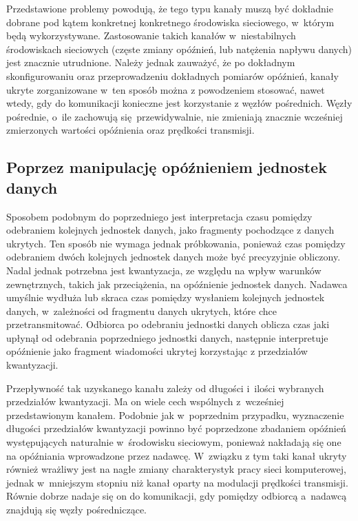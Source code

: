 \documentclass[a4paper, twoside, openright, 12pt]{report}
\begin{document}
        Przedstawione problemy powodują, że tego typu kanały muszą być dokładnie
        dobrane pod kątem konkretnej konkretnego środowiska sieciowego, w~którym będą wykorzystywane.
        Zastosowanie takich kanałów w~niestabilnych środowiskach sieciowych (częste zmiany
        opóźnień, lub natężenia napływu danych) jest znacznie utrudnione. Należy jednak
        zauważyć, że po dokładnym skonfigurowaniu oraz przeprowadzeniu dokładnych
        pomiarów opóźnień, kanały ukryte zorganizowane w~ten sposób można z powodzeniem
        stosować, nawet wtedy, gdy do komunikacji konieczne jest korzystanie z węzłów pośrednich.
        Węzły pośrednie, o~ile zachowują się przewidywalnie, nie zmieniają znacznie wcześniej
        zmierzonych wartości opóźnienia oraz prędkości transmisji.

        \subsection{Poprzez manipulację opóźnieniem jednostek danych}
        Sposobem podobnym do poprzedniego jest interpretacja czasu pomiędzy odebraniem kolejnych jednostek danych,
        jako fragmenty pochodzące z danych ukrytych\cite{IPDELAYCHANNEL}. Ten sposób nie wymaga jednak próbkowania,
        ponieważ czas pomiędzy odebraniem dwóch kolejnych jednostek danych
        może być precyzyjnie obliczony. Nadal jednak potrzebna
        jest kwantyzacja, ze względu na wpływ warunków zewnętrznych, takich jak przeciążenia,
        na opóźnienie jednostek danych. Nadawca umyślnie wydłuża lub skraca czas pomiędzy
        wysłaniem kolejnych jednostek danych, w~zależności od fragmentu danych ukrytych,
        które chce przetransmitować. Odbiorca po odebraniu jednostki danych oblicza czas jaki
        upłynął od odebrania poprzedniego jednostki danych, następnie
        interpretuje opóźnienie jako fragment wiadomości ukrytej korzystając z
        przedziałów kwantyzacji.

        Przepływność tak uzyskanego kanału zależy od długości i~ilości wybranych
        przedziałów kwantyzacji. Ma on wiele cech wspólnych z~wcześniej przedstawionym
        kanałem. Podobnie jak w~poprzednim przypadku, wyznaczenie długości
        przedziałów kwantyzacji powinno być poprzedzone zbadaniem opóźnień występujących
        naturalnie w~środowisku sieciowym, ponieważ nakładają się one na opóźniania
        wprowadzone przez nadawcę. W~związku z tym taki kanał ukryty również wrażliwy jest
        na nagłe zmiany charakterystyk pracy sieci komputerowej, jednak w~mniejszym
        stopniu niż kanał oparty na modulacji prędkości transmisji. Równie dobrze
        nadaje się on do komunikacji, gdy pomiędzy odbiorcą a~nadawcą znajdują się
        węzły pośredniczące.
\end{document}

